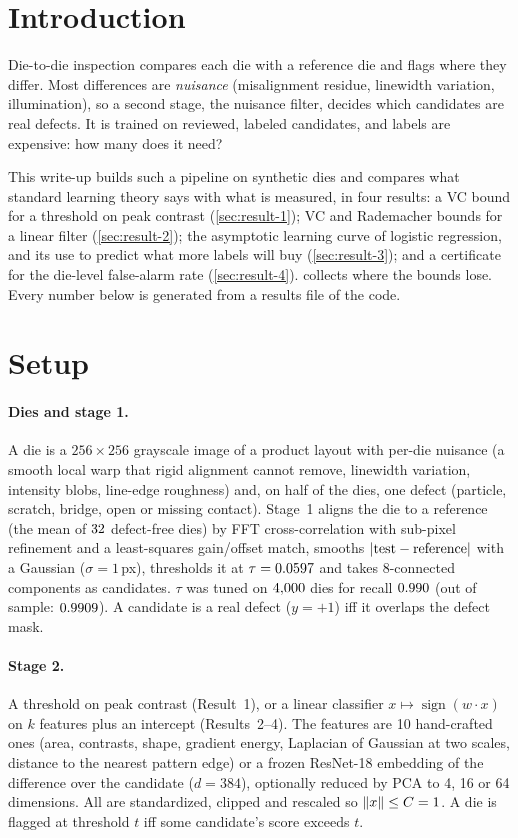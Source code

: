 \section{Introduction}
\label{sec:intro}

Die-to-die inspection compares each die with a reference die and flags where they differ. Most
differences are \emph{nuisance} (misalignment residue, linewidth variation, illumination), so a
second stage, the nuisance filter, decides which candidates are real defects. It is trained on
reviewed, labeled candidates, and labels are expensive: how many does it need?

This write-up builds such a pipeline on synthetic dies and compares what standard learning
theory says with what is measured, in four results: a VC bound for a threshold on peak contrast
(\cref{sec:result-1}); VC and Rademacher bounds for a linear filter (\cref{sec:result-2}); the
asymptotic learning curve of logistic regression, and its use to predict what more labels will
buy (\cref{sec:result-3}); and a certificate for the die-level false-alarm rate
(\cref{sec:result-4}).  collects where the bounds lose. Every number below is
generated from a results file of the code.

\section{Setup}
\label{sec:setting}

\paragraph{Dies and stage 1.} A die is a $256\times256$ grayscale image of a product layout with
per-die nuisance (a smooth local warp that rigid alignment cannot remove, linewidth variation,
intensity blobs, line-edge roughness) and, on half of the dies, one defect (particle, scratch,
bridge, open or missing contact). Stage~1 aligns the die to a reference (the mean of
$32$ defect-free dies) by FFT cross-correlation with sub-pixel refinement and a
least-squares gain/offset match, smooths $\left\lvert \text{test}-\text{reference} \right\rvert$ with a Gaussian
($\sigma=1$\,px), thresholds it at $\tau=0.0597$ and takes 8-connected components as
candidates. $\tau$ was tuned on $4{,}000$ dies for recall $0.990$ (out of
sample: $0.9909$). A candidate is a real defect ($y=+1$) iff it overlaps the defect mask.

\paragraph{Stage 2.} A threshold on peak contrast (Result~1), or a linear classifier
$x\mapsto\operatorname{sign}(w\cdot x)$ on $k$ features plus an intercept (Results~2--4). The
features are 10 hand-crafted ones (area, contrasts, shape, gradient energy, Laplacian of Gaussian
at two scales, distance to the nearest pattern edge) or a frozen ResNet-18 embedding of the
difference over the candidate ($d=384$), optionally reduced by PCA to 4, 16 or 64 dimensions. All
are standardized, clipped and rescaled so $\left\lVert x \right\rVert\le C=1$. A die is flagged at threshold $t$ iff
some candidate's score exceeds $t$.

